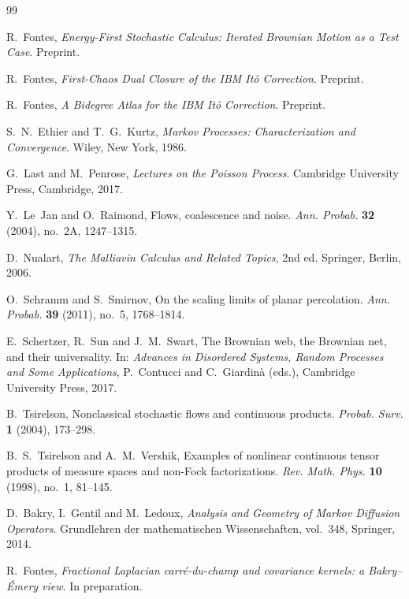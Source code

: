 \documentclass[11pt,reqno]{amsart}
\theoremstyle{plain}
\theoremstyle{definition}
\theoremstyle{remark}
\begin{document}
\begin{thebibliography}{99}

R.~Fontes,
\emph{Energy-First Stochastic Calculus: Iterated Brownian Motion as a Test Case}.
Preprint.

R.~Fontes,
\emph{First-Chaos Dual Closure of the IBM It\^o Correction}.
Preprint.

R.~Fontes,
\emph{A Bidegree Atlas for the IBM It\^o Correction}.
Preprint.

S.~N.~Ethier and T.~G.~Kurtz,
\emph{Markov Processes: Characterization and Convergence}.
Wiley, New York, 1986.

G.~Last and M.~Penrose,
\emph{Lectures on the Poisson Process}.
Cambridge University Press, Cambridge, 2017.

Y.~Le~Jan and O.~Raimond,
Flows, coalescence and noise.
\emph{Ann. Probab.} \textbf{32} (2004), no.~2A, 1247--1315.

D.~Nualart,
\emph{The Malliavin Calculus and Related Topics}, 2nd ed.
Springer, Berlin, 2006.

O.~Schramm and S.~Smirnov,
On the scaling limits of planar percolation.
\emph{Ann. Probab.} \textbf{39} (2011), no.~5, 1768--1814.

E.~Schertzer, R.~Sun and J.~M.~Swart,
The Brownian web, the Brownian net, and their universality.
In: \emph{Advances in Disordered Systems, Random Processes and Some Applications}, P.~Contucci and C.~Giardin\`a (eds.), Cambridge University Press, 2017.

B.~Tsirelson,
Nonclassical stochastic flows and continuous products.
\emph{Probab. Surv.} \textbf{1} (2004), 173--298.

B.~S.~Tsirelson and A.~M.~Vershik,
Examples of nonlinear continuous tensor products of measure spaces and non-Fock factorizations.
\emph{Rev. Math. Phys.} \textbf{10} (1998), no.~1, 81--145.

D.~Bakry, I.~Gentil and M.~Ledoux,
\emph{Analysis and Geometry of Markov Diffusion Operators}.
Grundlehren der mathematischen Wissenschaften, vol.~348, Springer, 2014.

R.~Fontes,
\emph{Fractional Laplacian carr\'e-du-champ and covariance kernels: a Bakry--\'Emery view}.
In preparation.

\end{thebibliography}
\end{document}
